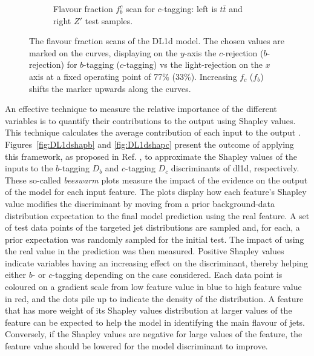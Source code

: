 \begin{figure}[h!]
\begin{subfigure}[b]{\textwidth}
    \caption{Flavour fraction $f_b^c$ scan for $c$-tagging: left is $t\bar{t}$ and right $Z'$ test samples.} 
    \label{fig:DL1dscanfc}
\end{subfigure}
  \caption{The flavour fraction scans of the DL1d model. The chosen values are marked on the curves, displaying on the $y$-axis the $c$-rejection ($b$-rejection) for $b$-tagging ($c$-tagging) vs the light-rejection on the $x$ axis at a fixed operating point of 77\% (33\%). Increasing $f_c$ ($f_b$) shifts the marker upwards along the curves. }
  \label{fig:DL1dscanf}
\end{figure} 

An effective technique to measure the relative importance of the different variables is to quantify their contributions to the output using Shapley values. This technique calculates the average contribution of each input to the output \cite{Rozemberczki2022TheSV}. Figures~\ref{fig:DL1dshapb} and \ref{fig:DL1dshapc} present the outcome of applying this framework, as proposed in Ref. \cite{NIPS2017_7062}, to approximate the Shapley values of the inputs to the $b$-tagging $D_b$ and $c$-tagging $D_c$ discriminants of \gls{dl1d}, respectively. These so-called \textit{beeswarm} plots measure the impact of the evidence on the output of the model for each input feature. The plots display how each feature's Shapley value modifies the discriminant by moving from a prior background-data distribution expectation to the final model prediction using the real feature. A set of test data points of the targeted jet distributions are sampled and, for each, a prior expectation was randomly sampled for the initial test. The impact of using the real value in the prediction was then measured. Positive Shapley values indicate variables having an increasing effect on the discriminant, thereby helping either $b$- or $c$-tagging depending on the case considered. Each data point is coloured on a gradient scale from low feature value in blue to high feature value in red, and the dots pile up to indicate the density of the distribution. A feature that has more weight of its Shapley values distribution at larger values of the feature can be expected to help the model in identifying the main flavour of jets. Conversely, if the Shapley values are negative for large values of the feature, the feature value should be lowered for the model discriminant to improve.

